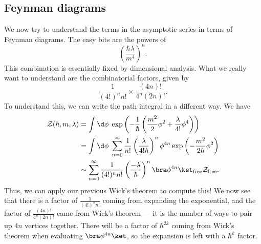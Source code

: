 \documentclass[a4paper]{article}
\begin{document}
\subsection{Feynman diagrams}
We now try to understand the terms in the asymptotic series in terms of Feynman diagrams. The easy bits are the powers of
\[
  \left(\frac{\hbar \lambda}{m^4}\right)^n.
\]
This combination is essentially fixed by dimensional analysis. What we really want to understand are the combinatorial factors, given by
\[
  \frac{1}{(4!)^n n!} \times \frac{(4n)!}{4^n (2n)!}.
\]
To understand this, we can write the path integral in a different way. We have
\begin{align*}
  \mathcal{Z}(\hbar, m, \lambda) &= \int \d \phi\; \exp\left(-\frac{1}{\hbar} \left(\frac{m^2}{2} \phi^2 + \frac{\lambda}{4!}\phi^4\right)\right)\\
  &= \int \d \phi\; \sum_{n = 0}^\infty \frac{1}{n!} \left(\frac{\lambda}{4! \hbar}\right)^n \phi^{4n} \exp\left(-\frac{m^2}{2\hbar} \phi^2\right)\\
  &\sim \sum_{n = 0}^\infty \frac{1}{(4!)^nn!} \left(\frac{-\lambda}{\hbar}\right)^n \bra \phi^{4n}\ket_{\mathrm{free}}\mathcal{Z}_{\mathrm{free}}.
\end{align*}
Thus, we can apply our previous Wick's theorem to compute this! We now see that there is a factor of $\frac{1}{(4!)^nn!}$ coming from expanding the exponential, and the factor of $\frac{(4n)!}{4^n(2n)!}$ came from Wick's theorem --- it is the number of ways to pair up $4n$ vertices together. There will be a factor of $\hbar^{2k}$ coming from Wick's theorem when evaluating $\bra \phi^{4n}\ket$, so the expansion is left with a $\hbar^k$ factor.
\end{document}

